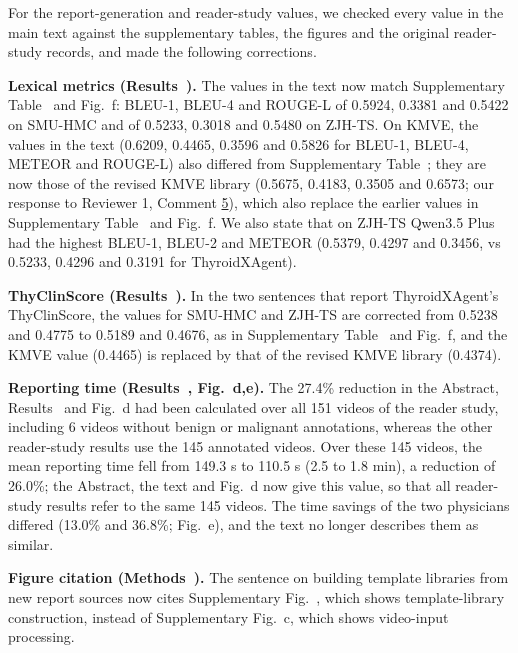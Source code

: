For the report-generation and reader-study values, we checked every value in the main text against the supplementary tables, the figures and the original reader-study records, and made the following corrections.\par

\textbf{Lexical metrics (Results~\SecResReport{}).} The values in the text now match Supplementary Table~\SuppTabNLG{} and Fig.~\FigReportGen{}f: BLEU-1, BLEU-4 and ROUGE-L of 0.5924, 0.3381 and 0.5422 on SMU-HMC and of 0.5233, 0.3018 and 0.5480 on ZJH-TS. On KMVE, the values in the text (0.6209, 0.4465, 0.3596 and 0.5826 for BLEU-1, BLEU-4, METEOR and ROUGE-L) also differed from Supplementary Table~\SuppTabNLG{}; they are now those of the revised KMVE library (0.5675, 0.4183, 0.3505 and 0.6573; our response to Reviewer 1, Comment \hyperref[rev:R1.5]{5}), which also replace the earlier values in Supplementary Table~\SuppTabNLG{} and Fig.~\FigReportGen{}f. We also state that on ZJH-TS Qwen3.5 Plus had the highest BLEU-1, BLEU-2 and METEOR (0.5379, 0.4297 and 0.3456, vs 0.5233, 0.4296 and 0.3191 for ThyroidXAgent).\par

\textbf{ThyClinScore (Results~\SecResReport{}).} In the two sentences that report ThyroidXAgent's ThyClinScore, the values for SMU-HMC and ZJH-TS are corrected from 0.5238 and 0.4775 to 0.5189 and 0.4676, as in Supplementary Table~\SuppTabClinical{} and Fig.~\FigReportGen{}f, and the KMVE value (0.4465) is replaced by that of the revised KMVE library (0.4374).\par

\textbf{Reporting time (Results~\SecResReport{}, Fig.~\FigReader{}d,e).} The 27.4\% reduction in the Abstract, Results~\SecResReport{} and Fig.~\FigReader{}d had been calculated over all 151 videos of the reader study, including 6 videos without benign or malignant annotations, whereas the other reader-study results use the 145 annotated videos. Over these 145 videos, the mean reporting time fell from 149.3 s to 110.5 s (2.5 to 1.8 min), a reduction of 26.0\%; the Abstract, the text and Fig.~\FigReader{}d now give this value, so that all reader-study results refer to the same 145 videos. The time savings of the two physicians differed (13.0\% and 36.8\%; Fig.~\FigReader{}e), and the text no longer describes them as similar.\par

\textbf{Figure citation (Methods~\SecMethReport{}).} The sentence on building template libraries from new report sources now cites Supplementary Fig.~\SuppFigTemplateBank{}, which shows template-library construction, instead of Supplementary Fig.~\SuppFigInterface{}c, which shows video-input processing.\par
